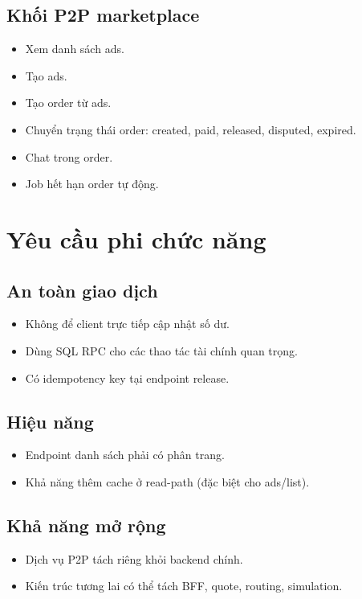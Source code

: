 \documentclass[a4paper,12pt]{report}
\begin{document}
\subsection{Khối P2P marketplace}
\begin{itemize}
    \item Xem danh sách ads.
    \item Tạo ads.
    \item Tạo order từ ads.
    \item Chuyển trạng thái order: created, paid, released, disputed, expired.
    \item Chat trong order.
    \item Job hết hạn order tự động.
\end{itemize}

\section{Yêu cầu phi chức năng}
\subsection{An toàn giao dịch}
\begin{itemize}
    \item Không để client trực tiếp cập nhật số dư.
    \item Dùng SQL RPC cho các thao tác tài chính quan trọng.
    \item Có idempotency key tại endpoint release.
\end{itemize}

\subsection{Hiệu năng}
\begin{itemize}
    \item Endpoint danh sách phải có phân trang.
    \item Khả năng thêm cache ở read-path (đặc biệt cho ads/list).
\end{itemize}

\subsection{Khả năng mở rộng}
\begin{itemize}
    \item Dịch vụ P2P tách riêng khỏi backend chính.
    \item Kiến trúc tương lai có thể tách BFF, quote, routing, simulation.
\end{itemize}
\end{document}
